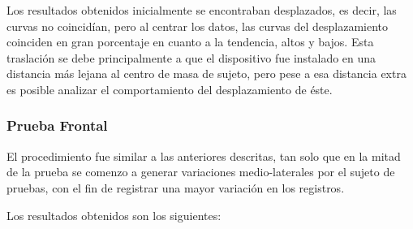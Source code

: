 \documentclass[12pt,a4paper]{article}
\begin{document}
	Los resultados obtenidos inicialmente se encontraban desplazados, es decir, las curvas no coincidían, pero al centrar los datos, las curvas del desplazamiento coinciden en gran porcentaje en cuanto a la tendencia, altos y bajos.
	Esta traslación se debe principalmente a que el dispositivo fue instalado en una distancia más lejana al centro de masa de sujeto, pero pese a esa distancia extra es posible analizar el comportamiento del desplazamiento de éste.
	
\newpage
\subsubsection{Prueba Frontal}
El procedimiento fue similar a las anteriores descritas, tan solo que en la mitad de la prueba se comenzo a generar variaciones medio-laterales por el sujeto de pruebas, con el fin de registrar una mayor variación en los registros.

Los resultados obtenidos son los siguientes:
	
\end{document}
